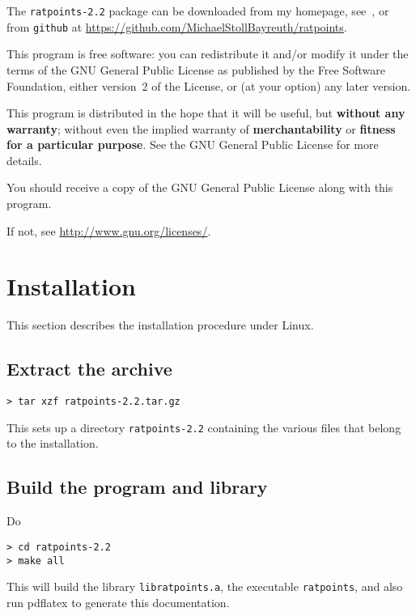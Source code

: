 \documentclass[12pt,a4paper,oneside]{amsart}
\newcommand{\rpversion}{2.2} %
\begin{document}
The \texttt{ratpoints-\rpversion} package can be downloaded from my homepage,
see~\cite{ratpoints}, or from \texttt{github} at
\url{https://github.com/MichaelStollBayreuth/ratpoints}.

This program is free software: you can redistribute it and/or modify
it under the terms of the GNU General Public License as published
by the Free Software Foundation, either version~2 of the License, or
(at your option) any later version.

This program is distributed in the hope that it will be useful,
but \textbf{without any warranty}; without even the implied warranty of
\textbf{merchantability} or \textbf{fitness for a particular purpose}. See the
GNU General Public License for more details.

You should receive a copy of the GNU General Public License
along with this program.

If not, see \url{http://www.gnu.org/licenses/}.


\section{Installation}

This section describes the installation procedure under Linux.

\subsection{Extract the archive}

\begin{verbatim}
> tar xzf ratpoints-2.2.tar.gz
\end{verbatim}

This sets up a directory \texttt{ratpoints-\rpversion} containing the various
files that belong to the installation.

\subsection{Build the program and library}

Do

\begin{verbatim}
> cd ratpoints-2.2
> make all
\end{verbatim}

This will build the library \texttt{libratpoints.a}, the executable
\texttt{ratpoints}, and also run pdf\/latex to generate this documentation.
\end{document}
